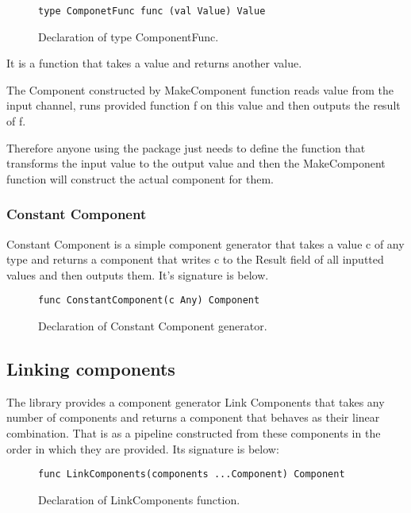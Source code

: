 \documentclass[12pt,a4paper]{article}
\begin{document}
\begin{figure}[h]
\centering
\begin{lstlisting}
type ComponetFunc func (val Value) Value
\end{lstlisting}
\caption[scale=1.0]{Declaration of type ComponentFunc.}
\label{fig:ComponentFunc}
\end{figure}

It is a function that takes a value and returns another value.

The Component constructed by MakeComponent function reads value from the
input channel, runs provided function f on this value and then outputs the
result of f.

Therefore anyone using the package just needs to define the function that
transforms the input value to the output value and then the MakeComponent
function will construct the actual component for them.

\subsubsection{Constant Component}
Constant Component is a simple component generator that takes a value c
of any type and returns a component that writes c to the Result field of all inputted values and then outputs them. It's signature is below.

\begin{figure}[h]
\centering
\begin{lstlisting}
func ConstantComponent(c Any) Component
\end{lstlisting}
\caption[scale=1.0]{Declaration of Constant Component generator.}
\label{fig:ConstantComponent}
\end{figure}


\subsection{Linking components}
The library provides a component generator Link Components that takes 
any number of components and returns a component that behaves as their 
linear combination. That is as a pipeline constructed from these components 
in the order in which they are provided. Its signature is below:

\begin{figure}[h]
\centering
\begin{lstlisting}
func LinkComponents(components ...Component) Component
\end{lstlisting}
\caption[scale=1.0]{Declaration of LinkComponents function.}
\label{fig:LinkComponents}
\end{figure}
\end{document}
